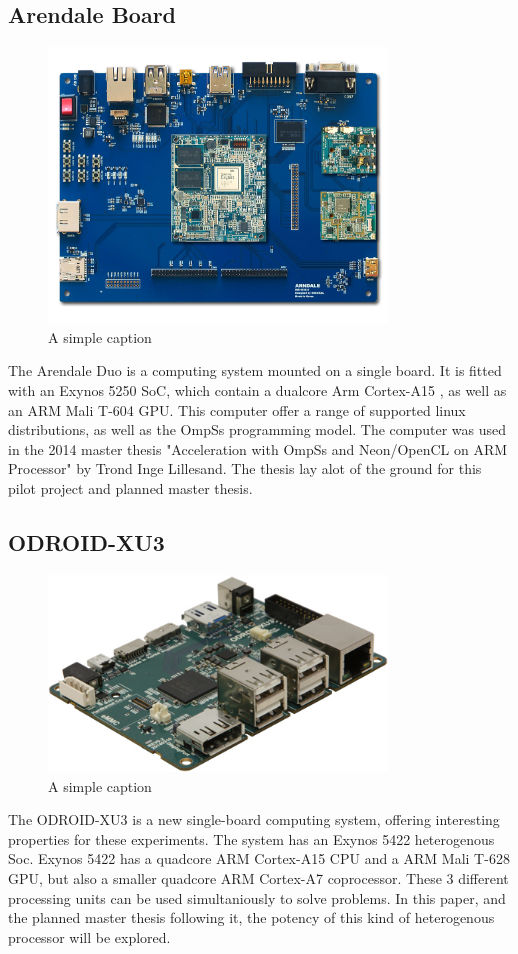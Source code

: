 \subsection{Arendale Board}
\begin{figure}[ht!]
  \centering
  \includegraphics[width=90mm]{fig/Arendale.jpg}
  \caption{A simple caption \label{overflow}}
\end{figure}
The Arendale Duo is a computing system mounted on a single board.
It is fitted with an Exynos 5250 SoC, which contain a dualcore Arm Cortex-A15 , as well as an ARM Mali T-604 GPU.
This computer offer a range of supported linux distributions, as well as the OmpSs programming model.
The computer was used in the 2014 master thesis "Acceleration with OmpSs and Neon/OpenCL on ARM Processor" by Trond Inge Lillesand.
The thesis lay alot of the ground for this pilot project and planned master thesis.

\subsection{ODROID-XU3}
\begin{figure}[ht!]
  \centering
  \includegraphics[width=90mm]{fig/ODROID.jpg}
  \caption{A simple caption \label{overflow}}
\end{figure}
The ODROID-XU3 is a new single-board computing system, offering interesting properties for these experiments.
The system has an Exynos 5422 heterogenous Soc.
Exynos 5422 has a quadcore ARM Cortex-A15 CPU and a ARM Mali T-628 GPU, but also a smaller quadcore ARM Cortex-A7 coprocessor.
These 3 different processing units can be used simultaniously to solve problems.
In this paper, and the planned master thesis following it, the potency of this kind of heterogenous processor will be explored.

